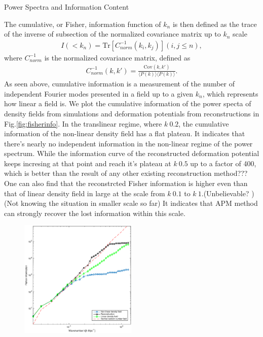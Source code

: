 \begin{section}{Power Spectra and Information Content}
\begin{figure}
    \label{fig:corrall}

\end{figure}
    The cumulative, or Fisher, information function of $k_n$ is then defined as the trace of the inverse of subsection of the normalized covariance matrix up to $k_n$ scale
\begin{align}
    I \left( < k_n\right) = \mathrm{Tr} \left[ C^{-1}_{norm} \left( k_i,k_j \right)\right] \left( i,j \leq n \right),
\end{align}
where $C^{-1}_{norm}$ is the normalized covariance matrix, defined as
\begin{align}
    C^{-1}_{norm} \left( k,k' \right)=\frac{\mathrm{Cov}(k,k')}{\langle P(k)\rangle\langle P(k)\rangle}.
\end{align}
As seen above, cumulative information is a measurement of the number of independent Fourier modes presented in a field up to a given $k_n$, which represents how linear a field is. We plot the cumulative information of the power specta of density fields from simulations and deformation potentials from reconstructions in Fig.\ref{fig:fisherinfo}. In the translinear regime, where $k~0.2$, the cumulative information of the non-linear density field has a flat plateau. It indicates that there's nearly no independent information in the non-linear regime of the power spectrum. While the information curve of the reconstructed deformation potential keeps incresing at that point and reach it's plateau at $k~0.5$ up to a factor of 400, which is better than the result of any other existing reconstruction method??? One can also find that the reconstrcted Fisher information is higher even than that of linear density field in large at the scale from $k~0.1$ to $k~1$.(Unbelievable? )(Not knowing the situation in smaller scale so far) It indicates that APM method can strongly recover the lost information within this scale. 
\begin{figure}[htbp]
 \begin{center}
  \includegraphics[width=0.5\textwidth]{fishall.eps}

\end{center}
\end{figure}
\end{section}

